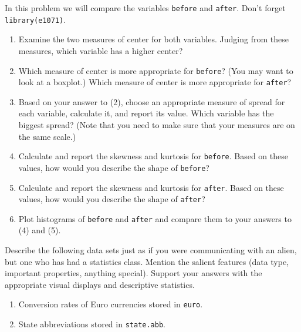 \documentclass[captions=tableheading]{scrbook}
\begin{document}
\begin{xca}
In this problem we will compare the variables \texttt{before} and \texttt{after}. Don't forget \texttt{library(e1071)}.
\begin{enumerate}
\item Examine the two measures of center for both variables. Judging from these measures, which variable has a higher center?
\item Which measure of center is more appropriate for \texttt{before}? (You may want to look at a boxplot.) Which measure of center is more appropriate for \texttt{after}?
\item Based on your answer to (2), choose an appropriate measure of spread for each variable, calculate it, and report its value. Which variable has the biggest spread? (Note that you need to make sure that your measures are on the same scale.)
\item Calculate and report the skewness and kurtosis for \texttt{before}. Based on these values, how would you describe the shape of \texttt{before}?
\item Calculate and report the skewness and kurtosis for \texttt{after}. Based on these values, how would you describe the shape of \texttt{after}?
\item Plot histograms of \texttt{before} and \texttt{after} and compare them to your answers to (4) and (5).
\end{enumerate}
\end{xca}

\begin{xca}
Describe the following data sets just as if you were communicating with an alien, but one who has had a statistics class. Mention the salient features (data type, important properties, anything special). Support your answers with the appropriate visual displays and descriptive statistics.
\begin{enumerate}
\item Conversion rates of Euro currencies stored in \texttt{euro}.
\item State abbreviations stored in \texttt{state.abb}.
\end{enumerate}
\end{xca}
\end{document}
